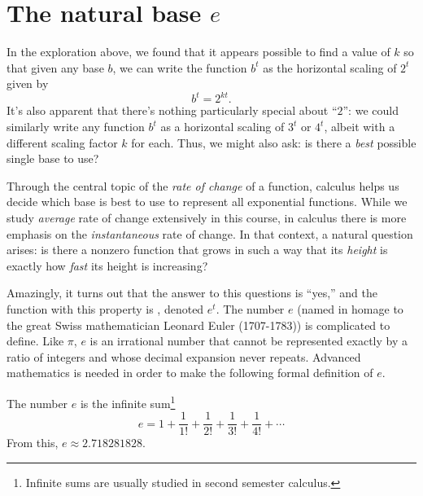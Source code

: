 \documentclass[nooutcomes]{ximera}
\begin{document}

\section{The natural base $e$}

In the exploration above, we found that it appears possible to find a value of $k$ so that given any base $b$, we can write the function $b^t$ as the horizontal scaling of $2^t$ given by%
\begin{equation*}
b^t = 2^{kt}\text{.}
\end{equation*}
It's also apparent that there's nothing particularly special about ``$2$'': we could similarly write any function $b^t$ as a horizontal scaling of $3^t$ or $4^t$, albeit with a different scaling factor $k$ for each.  Thus, we might also ask:  is there a \emph{best} possible single base to use?

Through the central topic of the \emph{rate of change} of a function, calculus helps us decide which base is best to use to represent all exponential functions.  While we study \emph{average} rate of change extensively in this course, in calculus there is more emphasis on the \emph{instantaneous} rate of change.  In that context, a natural question arises: is there a nonzero function that grows in such a way that its \emph{height} is exactly how \emph{fast} its height is increasing?

Amazingly, it turns out that the answer to this questions is ``yes,'' and the function with this property is , denoted $e^t$. The number $e$ (named in homage to the great Swiss mathematician Leonard Euler (1707-1783)) is complicated to define.  Like $\pi$, $e$ is an irrational number that cannot be represented exactly by a ratio of integers and whose decimal expansion never repeats.  Advanced mathematics is needed in order to make the following formal definition of $e$.%

\begin{definition}
The number $e$ is the infinite sum\footnote{Infinite sums are usually studied in second semester calculus.\label{fn-28}}%
\begin{equation*}
e = 1 + \frac{1}{1!} + \frac{1}{2!} + \frac{1}{3!} + \frac{1}{4!} + \cdots
\end{equation*}
From this, $e \approx 2.718281828$.%
\end{definition}
\end{document}
